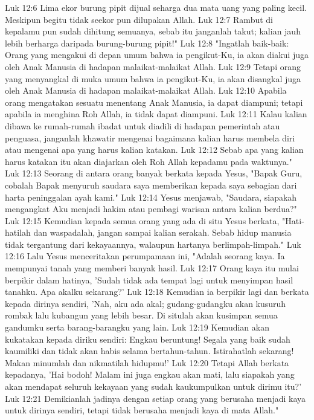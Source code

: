 Luk 12:6  Lima ekor burung pipit dijual seharga dua mata uang yang paling kecil. Meskipun begitu tidak seekor pun dilupakan Allah.
Luk 12:7  Rambut di kepalamu pun sudah dihitung semuanya, sebab itu janganlah takut; kalian jauh lebih berharga daripada burung-burung pipit!"
Luk 12:8  "Ingatlah baik-baik: Orang yang mengakui di depan umum bahwa ia pengikut-Ku, ia akan diakui juga oleh Anak Manusia di hadapan malaikat-malaikat Allah.
Luk 12:9  Tetapi orang yang menyangkal di muka umum bahwa ia pengikut-Ku, ia akan disangkal juga oleh Anak Manusia di hadapan malaikat-malaikat Allah.
Luk 12:10  Apabila orang mengatakan sesuatu menentang Anak Manusia, ia dapat diampuni; tetapi apabila ia menghina Roh Allah, ia tidak dapat diampuni.
Luk 12:11  Kalau kalian dibawa ke rumah-rumah ibadat untuk diadili di hadapan pemerintah atau penguasa, janganlah khawatir mengenai bagaimana kalian harus membela diri atau mengenai apa yang harus kalian katakan.
Luk 12:12  Sebab apa yang kalian harus katakan itu akan diajarkan oleh Roh Allah kepadamu pada waktunya."
Luk 12:13  Seorang di antara orang banyak berkata kepada Yesus, "Bapak Guru, cobalah Bapak menyuruh saudara saya memberikan kepada saya sebagian dari harta peninggalan ayah kami."
Luk 12:14  Yesus menjawab, "Saudara, siapakah mengangkat Aku menjadi hakim atau pembagi warisan antara kalian berdua?"
Luk 12:15  Kemudian kepada semua orang yang ada di situ Yesus berkata, "Hati-hatilah dan waspadalah, jangan sampai kalian serakah. Sebab hidup manusia tidak tergantung dari kekayaannya, walaupun hartanya berlimpah-limpah."
Luk 12:16  Lalu Yesus menceritakan perumpamaan ini, "Adalah seorang kaya. Ia mempunyai tanah yang memberi banyak hasil.
Luk 12:17  Orang kaya itu mulai berpikir dalam hatinya, 'Sudah tidak ada tempat lagi untuk menyimpan hasil tanahku. Apa akalku sekarang?'
Luk 12:18  Kemudian ia berpikir lagi dan berkata kepada dirinya sendiri, 'Nah, aku ada akal; gudang-gudangku akan kusuruh rombak lalu kubangun yang lebih besar. Di situlah akan kusimpan semua gandumku serta barang-barangku yang lain.
Luk 12:19  Kemudian akan kukatakan kepada diriku sendiri: Engkau beruntung! Segala yang baik sudah kaumiliki dan tidak akan habis selama bertahun-tahun. Istirahatlah sekarang! Makan minumlah dan nikmatilah hidupmu!'
Luk 12:20  Tetapi Allah berkata kepadanya, 'Hai bodoh! Malam ini juga engkau akan mati, lalu siapakah yang akan mendapat seluruh kekayaan yang sudah kaukumpulkan untuk dirimu itu?'
Luk 12:21  Demikianlah jadinya dengan setiap orang yang berusaha menjadi kaya untuk dirinya sendiri, tetapi tidak berusaha menjadi kaya di mata Allah."
